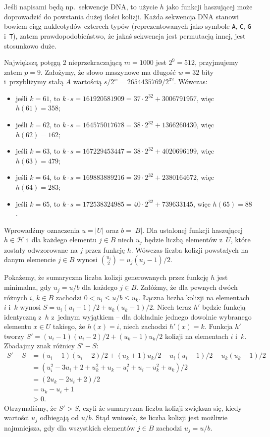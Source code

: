 Jeśli napisami będą np.\ sekwencje DNA, to użycie $h$ jako funkcji haszującej może doprowadzić do powstania dużej ilości kolizji.
Każda sekwencja DNA stanowi bowiem ciąg nukleotydów czterech typów (reprezentowanych jako symbole \texttt{A}, \texttt{C}, \texttt{G} i~\texttt{T}), zatem prawdopodobieństwo, że jakaś sekwencja jest permutacją innej, jest stosunkowo duże.

\exercise %
Największą potęgą 2 nieprzekraczającą $m=1000$ jest $2^9=512$, przyjmujemy zatem $p=9$.
Założymy, że słowo maszynowe ma długość $w=32$ bity i~przybliżymy stałą $A$ wartością $s/2^w=2654435769/2^{32}$.
Wówczas:
\begin{itemize}
	\item jeśli $k=61$, to $k\cdot s=161920581909=37\cdot2^{32}+3006791957$, więc $h(61)=358$;
	\item jeśli $k=62$, to $k\cdot s=164575017678=38\cdot2^{32}+1366260430$, więc $h(62)=162$;
	\item jeśli $k=63$, to $k\cdot s=167229453447=38\cdot2^{32}+4020696199$, więc $h(63)=479$;
	\item jeśli $k=64$, to $k\cdot s=169883889216=39\cdot2^{32}+2380164672$, więc $h(64)=283$;
	\item jeśli $k=65$, to $k\cdot s=172538324985=40\cdot2^{32}+739633145$, więc $h(65)=88$.
\end{itemize}

\exercise %
Wprowadźmy oznaczenia $u=|U|$ oraz $b=|B|$.
Dla ustalonej funkcji haszującej $h\in\mathcal{H}$ i~dla każdego elementu $j\in B$ niech $u_j$ będzie liczbą elementów z~$U$, które zostały odwzorowane na $j$ przez funkcję $h$.
Wówczas liczba kolizji powstałych na danym elemencie $j\in B$ wynosi $\binom{u_j}{2}=u_j(u_j-1)/2$.

Pokażemy, że sumaryczna liczba kolizji generowanych przez funkcję $h$ jest minimalna, gdy $u_j=u/b$ dla każdego $j\in B$.
Załóżmy, że dla pewnych dwóch różnych $i$, $k\in B$ zachodzi $0<u_i\le u/b\le u_k$.
Łączna liczba kolizji na elementach $i$ i~$k$ wynosi $S=u_i(u_i-1)/2+u_k(u_k-1)/2$.
Niech teraz $h'$ będzie funkcją identyczną z~$h$ z~jednym wyjątkiem -- dla dokładnie jednego dowolnie wybranego elementu $x\in U$ takiego, że $h(x)=i$, niech zachodzi $h'(x)=k$.
Funkcja $h'$ tworzy $S'=(u_i-1)(u_i-2)/2+(u_k+1)u_k/2$ kolizji na elementach $i$ i~$k$.
Zbadajmy znak różnicy $S'-S$:
\begin{align*}
	S'-S &= (u_i-1)(u_i-2)/2+(u_k+1)u_k/2-u_i(u_i-1)/2-u_k(u_k-1)/2 \\
	&= (u_i^2-3u_i+2+u_k^2+u_k-u_i^2+u_i-u_k^2+u_k)/2 \\
	&= (2u_k-2u_i+2)/2 \\
	&= u_k-u_i+1 \\
	&> 0.
\end{align*}
Otrzymaliśmy, że $S'>S$, czyli że sumaryczna liczba kolizji zwiększa się, kiedy wartości $u_j$ odbiegają od $u/b$.
Stąd wniosek, że liczba kolizji jest możliwie najmniejsza, gdy dla wszystkich elementów $j\in B$ zachodzi $u_j=u/b$.

